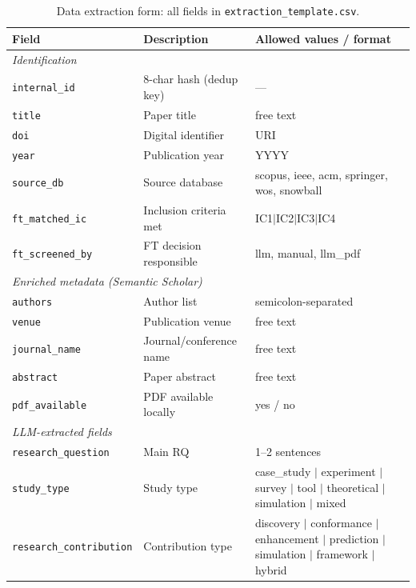 \begin{table}[htbp]
\centering
\caption{Data extraction form: all fields in \texttt{extraction\_template.csv}.}
\label{tab:app-extraction-fields}
\small
\setlength{\tabcolsep}{4pt}
\begin{tabular}{p{3.4cm} p{4.5cm} p{4.4cm}}
\toprule
\textbf{Field} & \textbf{Description} & \textbf{Allowed values / format} \\
\midrule
\multicolumn{3}{l}{\textit{Identification}} \\
\texttt{internal\_id}      & 8-char hash (dedup key)          & --- \\
\texttt{title}             & Paper title                      & free text \\
\texttt{doi}               & Digital identifier               & URI \\
\texttt{year}              & Publication year                 & YYYY \\
\texttt{source\_db}        & Source database                  & scopus, ieee, acm, springer, wos, snowball \\
\texttt{ft\_matched\_ic}   & Inclusion criteria met           & IC1$|$IC2$|$IC3$|$IC4 \\
\texttt{ft\_screened\_by}  & FT decision responsible          & llm, manual, llm\_pdf \\
\midrule
\multicolumn{3}{l}{\textit{Enriched metadata (Semantic Scholar)}} \\
\texttt{authors}           & Author list                      & semicolon-separated \\
\texttt{venue}             & Publication venue                & free text \\
\texttt{journal\_name}     & Journal/conference name          & free text \\
\texttt{abstract}          & Paper abstract                   & free text \\
\texttt{pdf\_available}    & PDF available locally            & yes / no \\
\midrule
\multicolumn{3}{l}{\textit{LLM-extracted fields}} \\
\texttt{research\_question}    & Main RQ                      & 1--2 sentences \\
\texttt{study\_type}           & Study type                   & case\_study $|$ experiment $|$ survey $|$ tool $|$ theoretical $|$ simulation $|$ mixed \\
\texttt{research\_contribution}& Contribution type            & discovery $|$ conformance $|$ enhancement $|$ prediction $|$ simulation $|$ framework $|$ hybrid \\

\end{tabular}
\end{table}
